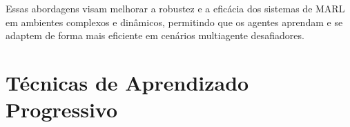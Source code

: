 Essas abordagens visam melhorar a robustez e a eficácia dos sistemas de MARL em ambientes complexos e dinâmicos, permitindo que os agentes aprendam e se adaptem de forma mais eficiente em cenários multiagente desafiadores.




\section{Técnicas de Aprendizado Progressivo}
\label{sec:aprendizado_prog}

